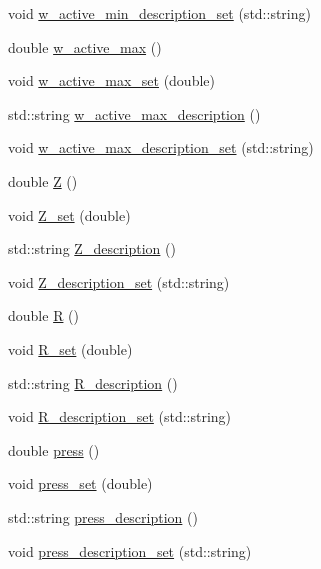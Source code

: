\begin{DoxyCompactItemize}
\item 
void \hyperlink{class_config___settings_a1c553737658161f4addc22ad8fb4796c}{w\+\_\+active\+\_\+min\+\_\+description\+\_\+set} (std\+::string)
\item 
double \hyperlink{class_config___settings_a17165addafe947c32457035b1a920d18}{w\+\_\+active\+\_\+max} ()
\item 
void \hyperlink{class_config___settings_a746e7376dacda6358184087a0c902486}{w\+\_\+active\+\_\+max\+\_\+set} (double)
\item 
std\+::string \hyperlink{class_config___settings_a99acf11a5682e9cee68cae24028eefbc}{w\+\_\+active\+\_\+max\+\_\+description} ()
\item 
void \hyperlink{class_config___settings_a1d93425d204d595db140648c2b582103}{w\+\_\+active\+\_\+max\+\_\+description\+\_\+set} (std\+::string)
\item 
double \hyperlink{class_config___settings_a1c01d83346316e0467ccbb0051e7461d}{Z} ()
\item 
void \hyperlink{class_config___settings_a3e2dbb19bd98a0ffe03e110be7b67887}{Z\+\_\+set} (double)
\item 
std\+::string \hyperlink{class_config___settings_afcb63f53c1a6a4e4d6240a10be72970c}{Z\+\_\+description} ()
\item 
void \hyperlink{class_config___settings_a8e956243cd53b6bb7bf5c0cf66029e3c}{Z\+\_\+description\+\_\+set} (std\+::string)
\item 
double \hyperlink{class_config___settings_a1efaf096c7e87d4af210396dfc922999}{R} ()
\item 
void \hyperlink{class_config___settings_ac91047810edd5c7ca6879a4ec3b27530}{R\+\_\+set} (double)
\item 
std\+::string \hyperlink{class_config___settings_ade0c3d32a8320560d325388b21ad5c18}{R\+\_\+description} ()
\item 
void \hyperlink{class_config___settings_a14ced9f9c6df3c24b96cbb91be6314ec}{R\+\_\+description\+\_\+set} (std\+::string)
\item 
double \hyperlink{class_config___settings_a937591286a884213021151708e4483b0}{press} ()
\item 
void \hyperlink{class_config___settings_a6995d1f5f91fbc5229f9634b0daba17b}{press\+\_\+set} (double)
\item 
std\+::string \hyperlink{class_config___settings_a3a3b7b753d201b5990e302cc2e399fe8}{press\+\_\+description} ()
\item 
void \hyperlink{class_config___settings_a21e1e3dad8bff784a753ec82ff528464}{press\+\_\+description\+\_\+set} (std\+::string)

\end{DoxyCompactItemize}
